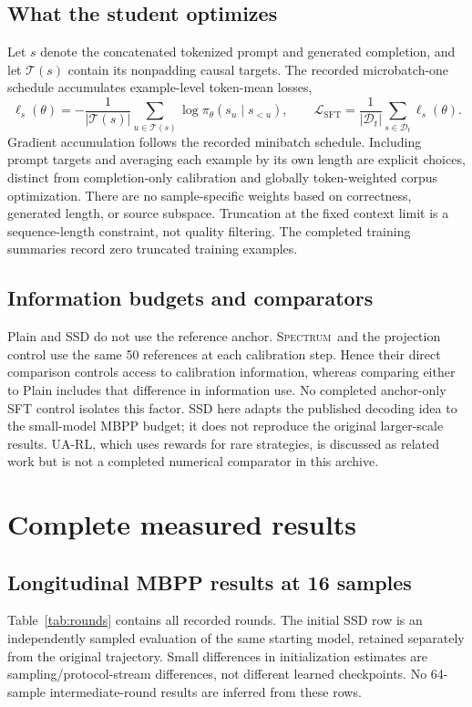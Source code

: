 \documentclass{article}
\newcommand{\method}{\textsc{Spectrum}}
\newcommand{\cD}{\mathcal D}
\begin{document}
\subsection{What the student optimizes}
Let $s$ denote the concatenated tokenized prompt and generated completion, and let $\mathcal T(s)$ contain its nonpadding causal targets. The recorded microbatch-one schedule accumulates example-level token-mean losses,
\begin{equation}
\ell_s(\theta)=-\frac{1}{|\mathcal T(s)|}\sum_{u\in\mathcal T(s)}\log\pi_\theta(s_u\mid s_{<u}),
\qquad \mathcal L_{\mathrm{SFT}}=\frac{1}{|\cD_t|}\sum_{s\in\cD_t}\ell_s(\theta).
\end{equation}
Gradient accumulation follows the recorded minibatch schedule. Including prompt targets and averaging each example by its own length are explicit choices, distinct from completion-only calibration and globally token-weighted corpus optimization. There are no sample-specific weights based on correctness, generated length, or source subspace. Truncation at the fixed context limit is a sequence-length constraint, not quality filtering. The completed training summaries record zero truncated training examples.

\subsection{Information budgets and comparators}
Plain and SSD do not use the reference anchor. \method\ and the projection control use the same 50 references at each calibration step. Hence their direct comparison controls access to calibration information, whereas comparing either to Plain includes that difference in information use. No completed anchor-only SFT control isolates this factor. SSD here adapts the published decoding idea to the small-model MBPP budget; it does not reproduce the original larger-scale results. UA-RL, which uses rewards for rare strategies, is discussed as related work but is not a completed numerical comparator in this archive.

\FloatBarrier
\section{Complete measured results}
\label{app:results}
\subsection{Longitudinal MBPP results at 16 samples}
Table~\ref{tab:rounds} contains all recorded rounds. The initial SSD row is an independently sampled evaluation of the same starting model, retained separately from the original trajectory. Small differences in initialization estimates are sampling/protocol-stream differences, not different learned checkpoints. No 64-sample intermediate-round results are inferred from these rows.
\end{document}
